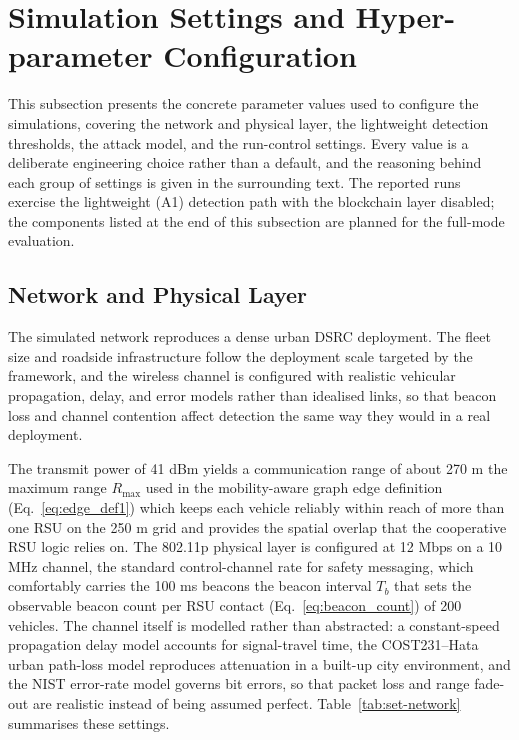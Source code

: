 \documentclass[12pt, a4paper]{report}
\begin{document}
\section{Simulation Settings and Hyper-parameter Configuration}
\label{sec:sim-settings}

This subsection presents the concrete parameter values used to configure the
simulations, covering the network and physical layer, the lightweight detection
thresholds, the attack model, and the run-control settings. Every value is a
deliberate engineering choice rather than a default, and the reasoning behind
each group of settings is given in the surrounding text. The reported runs
exercise the lightweight (A1) detection path with the blockchain layer disabled;
the components listed at the end of this subsection are planned for the full-mode
evaluation.

\subsection{Network and Physical Layer}

The simulated network reproduces a dense urban DSRC deployment. The fleet size
and roadside infrastructure follow the deployment scale targeted by the
framework, and the wireless channel is configured with realistic vehicular
propagation, delay, and error models rather than idealised links, so that beacon
loss and channel contention affect detection the same way they would in a real
deployment.

The transmit power of 41 dBm yields a communication range of about 270 m
the maximum range $R_{\max}$ used in the mobility-aware graph edge definition
(Eq.~\ref{eq:edge_def1})  which keeps each vehicle reliably within reach of
more than one RSU on the 250 m grid and provides the spatial overlap that the
cooperative RSU logic relies on. The 802.11p physical layer is configured at
12 Mbps on a 10 MHz channel, the standard control-channel rate for safety
messaging, which comfortably carries the 100 ms beacons the beacon interval
$T_b$ that sets the observable beacon count per RSU contact
(Eq.~\ref{eq:beacon_count}) of 200 vehicles. The channel itself is modelled
rather than abstracted: a constant-speed propagation delay model accounts for
signal-travel time, the COST231--Hata urban path-loss model reproduces
attenuation in a built-up city environment, and the NIST error-rate model
governs bit errors, so that packet loss and range fade-out are realistic instead
of being assumed perfect.
Table~\ref{tab:set-network} summarises these settings.
\end{document}
